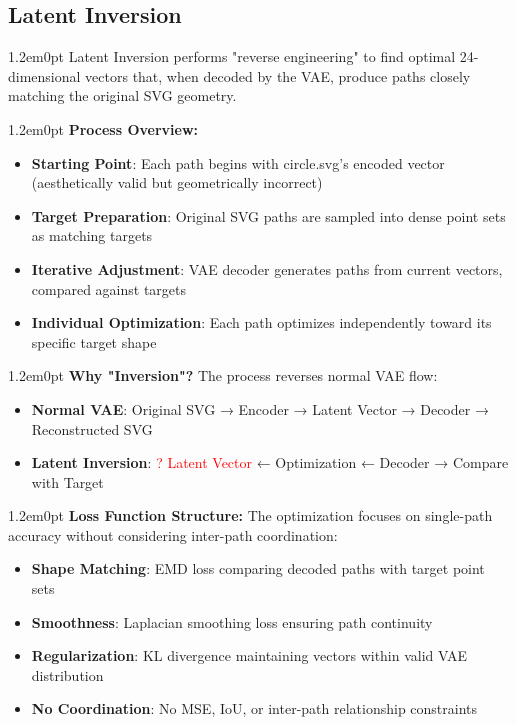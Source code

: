 \documentclass[10pt,a4paper]{article}
\newenvironment{bodytext}{\begin{adjustwidth}{1.2em}{0pt}}{\end{adjustwidth}}
\begin{document}
\subsection{Latent Inversion}

\begin{bodytext}
Latent Inversion performs "reverse engineering" to find optimal 24-dimensional vectors that, when decoded by the VAE, produce paths closely matching the original SVG geometry.
\end{bodytext}

\begin{bodytext}
\textbf{Process Overview:}
\begin{itemize}
\item \textbf{Starting Point}: Each path begins with circle.svg's encoded vector (aesthetically valid but geometrically incorrect)
\item \textbf{Target Preparation}: Original SVG paths are sampled into dense point sets as matching targets
\item \textbf{Iterative Adjustment}: VAE decoder generates paths from current vectors, compared against targets
\item \textbf{Individual Optimization}: Each path optimizes independently toward its specific target shape
\end{itemize}
\end{bodytext}

\begin{bodytext}
\textbf{Why "Inversion"?} The process reverses normal VAE flow:
\begin{itemize}
\item \textbf{Normal VAE}: Original SVG → Encoder → Latent Vector → Decoder → Reconstructed SVG
\item \textbf{Latent Inversion}: \textcolor{red}{? Latent Vector} ← Optimization ← Decoder → Compare with Target
\end{itemize}
\end{bodytext}

\begin{bodytext}
\textbf{Loss Function Structure:} The optimization focuses on single-path accuracy without considering inter-path coordination:
\begin{itemize}
\item \textbf{Shape Matching}: EMD loss comparing decoded paths with target point sets
\item \textbf{Smoothness}: Laplacian smoothing loss ensuring path continuity
\item \textbf{Regularization}: KL divergence maintaining vectors within valid VAE distribution
\item \textbf{No Coordination}: No MSE, IoU, or inter-path relationship constraints
\end{itemize}
\end{bodytext}
\end{document}
